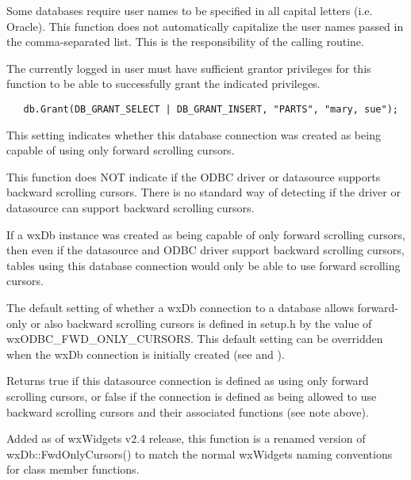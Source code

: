 
Some databases require user names to be specified in all capital letters (i.e. Oracle).  This function does not automatically capitalize the user names passed in the comma-separated list.  This is the responsibility of the calling routine.

The currently logged in user must have sufficient grantor privileges for this
function to be able to successfully grant the indicated privileges.


\begin{verbatim}
   db.Grant(DB_GRANT_SELECT | DB_GRANT_INSERT, "PARTS", "mary, sue");
\end{verbatim}

\label{wxdbisfwdonlycursors}


This setting indicates whether this database connection was created
as being capable of using only forward scrolling cursors.

This function does NOT indicate if the ODBC driver or datasource supports
backward scrolling cursors.  There is no standard way of detecting if the
driver or datasource can support backward scrolling cursors.

If a wxDb instance was created as being capable of only forward scrolling
cursors, then even if the datasource and ODBC driver support backward
scrolling cursors, tables using this database connection would only be able
to use forward scrolling cursors.

The default setting of whether a wxDb connection to a database allows
forward-only or also backward scrolling cursors is defined in setup.h by the
value of wxODBC\_FWD\_ONLY\_CURSORS.  This default setting can be overridden
when the wxDb connection is initially created (see
 and ).


Returns true if this datasource connection is defined as using only forward
scrolling cursors, or false if the connection is defined as being allowed to
use backward scrolling cursors and their associated functions (see note above).


Added as of wxWidgets v2.4 release, this function is a renamed version of
wxDb::FwdOnlyCursors() to match the normal wxWidgets naming conventions for
class member functions.

